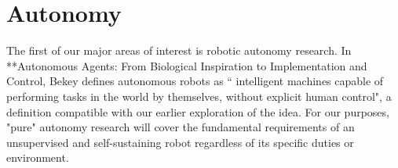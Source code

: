 \documentclass{sfuthesis}
\begin{document}














\chapter{Autonomy}

The first of our major areas of interest is robotic autonomy research. In **Autonomous Agents: From Biological Inspiration to Implementation and Control, Bekey defines autonomous robots as `` intelligent machines capable of performing tasks in the world by themselves, without explicit human control", a definition compatible with our earlier exploration of the idea. For our purposes, "pure" autonomy research will cover the fundamental requirements of an unsupervised and self-sustaining robot regardless of its specific duties or environment.
\end{document}
